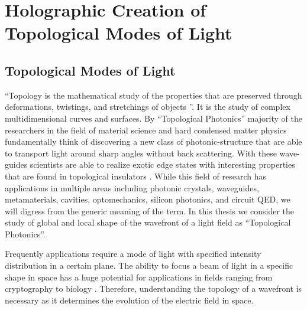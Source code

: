 \chapter{Holographic Creation of Topological Modes of Light}
\label{ch:topological_modes}

\section{Topological Modes of Light}
``Topology is the mathematical study of the properties that are preserved through deformations, twistings, and stretchings of objects \cite{topology}''. It is the study of complex multidimensional curves and surfaces. By ``Topological Photonics'' \cite{leykam2016, Zhou_2017} majority of the researchers in the field of material science and hard condensed matter physics fundamentally think of discovering a new class of photonic-structure \cite{Barik666} that are able to transport light around sharp angles without back scattering. With these wave-guides scientists are able to realize exotic edge states with interesting properties that are found  in topological insulators \cite{hsieh2008, haldane20107}. While this field of research has applications in multiple areas \cite{ozawa2019} including photonic crystals, waveguides, metamaterials, cavities, optomechanics, silicon photonics, and circuit QED, we will digress from the generic meaning of the term. In this thesis we consider the study of global and local shape of the wavefront of a light field as ``Topological Photonics''. 

Frequently applications require a mode of light with specified intensity distribution in a certain plane. The ability to focus a beam of light in a specific shape in space has a huge potential for applications in fields ranging from cryptography \cite{Horstmeyer2013, Horstmeyer2013cleo} to biology \cite{wang2012, Papadopoulos:12}. Therefore, understanding the topology of a wavefront is necessary as it determines the evolution of the electric field in space. 

